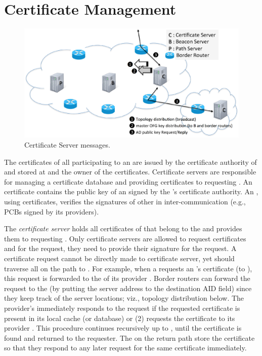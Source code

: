 
\section{Certificate Management} 

\begin{figure}[ht]
\centering
\includegraphics[width=.9\columnwidth]{./fig/cs_message.eps}
\caption{Certificate Server messages.}\label{fig:cs-message}
\end{figure}

 The certificates of all participating \ADs to an \ISD are issued by the certificate authority of \ISD and stored at \ISDC \ADs and the owner of the certificates. Certificate servers are responsible for managing a certificate database and providing certificates to requesting \ADs. An \AD certificate contains the public key of an \AD signed by the \ISD's certificate authority. An \AD, using \AD certificates, verifies the signatures of other \ADs in inter-\AD communication (e.g., PCBs signed by its providers).

The {\em \ISDC certificate server} holds all certificates of \ADs that belong to the \ISD and provides them to requesting \ADs. Only certificate servers are allowed to request \AD certificates and for the request, they need to provide their signature for the request. A certificate request cannot be directly made to \ISDC certificate server, yet should traverse all \CSs on the path to \ISDC. For example, when a \STUB \AD requests an \AD's certificate (to \ISDC), this request is forwarded to the \CS of its provider \AD. Border routers can forward the request to the \CS (by putting the server address to the destination AID field) since they keep track of the server locations; viz., topology distribution below. The provider's \CS immediately responds to the request if the requested certificate is present in its local cache (or database) or (2) requests the certificate to its provider \AD. This procedure continues recursively up to \ISDC, until the certificate is found and returned to the requester. The \CSs on the return path store the certificate so that they respond to any later request for  the same certificate immediately. 

